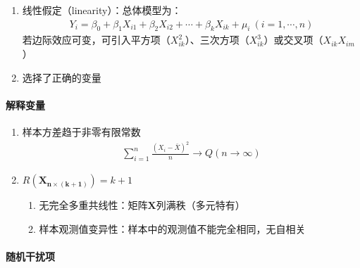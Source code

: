 \documentclass[12pt]{book}
\begin{document}
\begin{enumerate}[1.]
    \item 线性假定（linearity）：总体模型为：
          \begin{gather*}
              Y_i=\beta_0+\beta_1X_{i1}+\beta_2X_{i2}+\cdots+\beta_kX_{ik}+\mu_i\ \left(i=1,\cdots,n\right)
          \end{gather*}
          若边际效应可变，可引入平方项（$X_{ik}^2$）、三次方项（$X_{ik}^3$）或交叉项（$X_{ik}X_{im}$）
    \item 选择了正确的变量
\end{enumerate}




\paragraph{解释变量}


\begin{enumerate}[1.]
    \item 样本方差趋于非零有限常数
    \begin{gather*}
        \sum_{i=1}^{n}\frac{\left(X_i-\bar{X}\right)^2}{n}\rightarrow Q (n\rightarrow \infty )
    \end{gather*}
    \item $R\left(\bm{X}_{\bm{n}\times\left(\bm{k}+\bm{1}\right)}\right)=k+1$
    \begin{enumerate}[(1)]
        \item 无完全多重共线性：矩阵$\bm{X}$列满秩（多元特有）
        \item 样本观测值变异性：样本中的观测值不能完全相同，无自相关
    \end{enumerate}
\end{enumerate}




\paragraph{随机干扰项}
\end{document}
